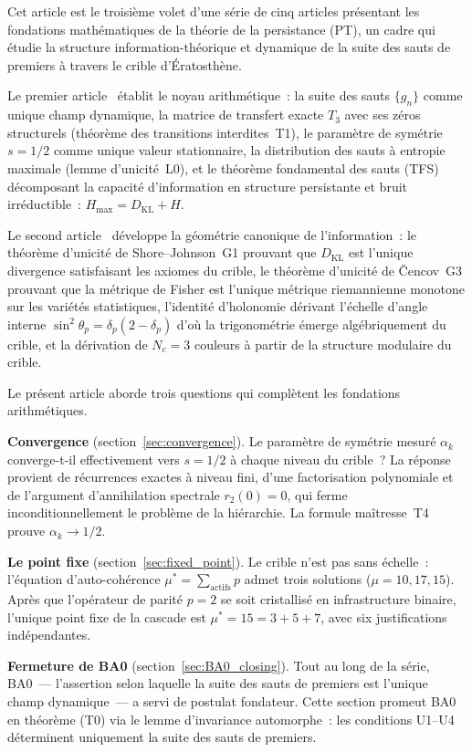 \documentclass[12pt,a4paper]{article}
\begin{document}
Cet article est le troisième volet d'une série de cinq articles
présentant les fondations mathématiques de la théorie de la
persistance (PT), un cadre qui étudie la structure
information-théorique et dynamique de la suite des sauts de premiers
à travers le crible d'Ératosthène.

Le premier article~\cite{companion_M1} établit le noyau arithmétique~:
la suite des sauts $\{g_n\}$ comme unique champ dynamique, la matrice
de transfert exacte $T_3$ avec ses zéros structurels (théorème des
transitions interdites~T1), le paramètre de symétrie $s = 1/2$ comme
unique valeur stationnaire, la distribution des sauts à entropie
maximale (lemme d'unicité~L0), et le théorème fondamental des sauts
(TFS) décomposant la capacité d'information en structure persistante
et bruit irréductible~: $H_{\max} = D_{\mathrm{KL}} + H$.

Le second article~\cite{companion_M2} développe la géométrie canonique
de l'information~: le théorème d'unicité de Shore--Johnson~G1 prouvant
que $D_{\mathrm{KL}}$ est l'unique divergence satisfaisant les axiomes
du crible, le théorème d'unicité de \v{C}encov~G3 prouvant que la
métrique de Fisher est l'unique métrique riemannienne monotone sur
les variétés statistiques, l'identité d'holonomie dérivant l'échelle
d'angle interne $\sin^2\!\theta_p = \delta_p(2 - \delta_p)$ d'où la
trigonométrie émerge algébriquement du crible, et la dérivation de
$N_c = 3$ couleurs à partir de la structure modulaire du crible.

Le présent article aborde trois questions qui complètent les
fondations arithmétiques.

\textbf{Convergence} (section~\ref{sec:convergence}). Le paramètre de
symétrie mesuré $\alpha_k$ converge-t-il effectivement vers $s = 1/2$
à chaque niveau du crible~? La réponse provient de récurrences exactes
à niveau fini, d'une factorisation polynomiale et de l'argument
d'annihilation spectrale $r_2(0) = 0$, qui ferme inconditionnellement
le problème de la hiérarchie. La formule maîtresse~T4 prouve
$\alpha_k \to 1/2$.

\textbf{Le point fixe} (section~\ref{sec:fixed_point}). Le crible
n'est pas sans échelle~: l'équation d'auto-cohérence
$\mu^* = \sum_{\text{actifs}} p$ admet trois solutions
($\mu = 10, 17, 15$). Après que l'opérateur de parité $p = 2$ se soit
cristallisé en infrastructure binaire, l'unique point fixe de la
cascade est $\mu^* = 15 = 3 + 5 + 7$, avec six justifications
indépendantes.

\textbf{Fermeture de BA0} (section~\ref{sec:BA0_closing}). Tout au
long de la série, BA0~--- l'assertion selon laquelle la suite des
sauts de premiers est l'unique champ dynamique~--- a servi de postulat
fondateur. Cette section promeut BA0 en théorème (T0) via le lemme
d'invariance automorphe~: les conditions U1--U4 déterminent uniquement
la suite des sauts de premiers.
\end{document}
